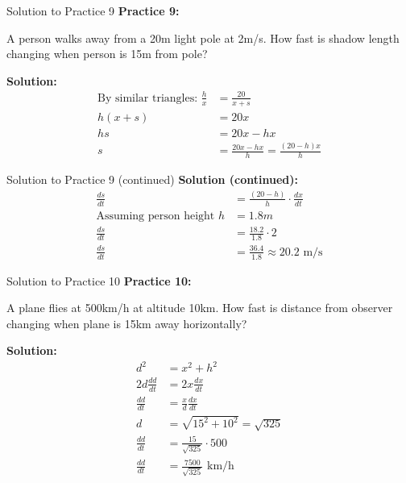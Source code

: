 \documentclass[aspectratio=169]{beamer}
\begin{document}
\begin{frame}{Solution to Practice 9}
\textbf{Practice 9:}

A person walks away from a 20m light pole at 2m/s. How fast is shadow length changing when person is 15m from pole?

\textbf{Solution:}
\[
\begin{aligned}
  \text{By similar triangles: } \frac{h}{x} &= \frac{20}{x + s} \\
  h(x + s) &= 20x \\
  hs &= 20x - hx \\
  s &= \frac{20x - hx}{h} = \frac{(20 - h)x}{h}
\end{aligned}
\]
\end{frame}

\begin{frame}{Solution to Practice 9 (continued)}
\textbf{Solution (continued):}
\[
\begin{aligned}
  \frac{ds}{dt} &= \frac{(20 - h)}{h} \cdot \frac{dx}{dt} \\
  \text{Assuming person height } h &= 1.8m \\
  \frac{ds}{dt} &= \frac{18.2}{1.8} \cdot 2 \\
  \frac{ds}{dt} &= \frac{36.4}{1.8} \approx 20.2 \text{ m/s}
\end{aligned}
\]
\end{frame}

\begin{frame}{Solution to Practice 10}
\textbf{Practice 10:}

A plane flies at 500km/h at altitude 10km. How fast is distance from observer changing when plane is 15km away horizontally?

\textbf{Solution:}
\[
\begin{aligned}
  d^2 &= x^2 + h^2 \\
  2d\frac{dd}{dt} &= 2x\frac{dx}{dt} \\
  \frac{dd}{dt} &= \frac{x}{d}\frac{dx}{dt} \\
  d &= \sqrt{15^2 + 10^2} = \sqrt{325} \\
  \frac{dd}{dt} &= \frac{15}{\sqrt{325}} \cdot 500 \\
  \frac{dd}{dt} &= \frac{7500}{\sqrt{325}} \text{ km/h}
\end{aligned}
\]
\end{frame}
\end{document}
